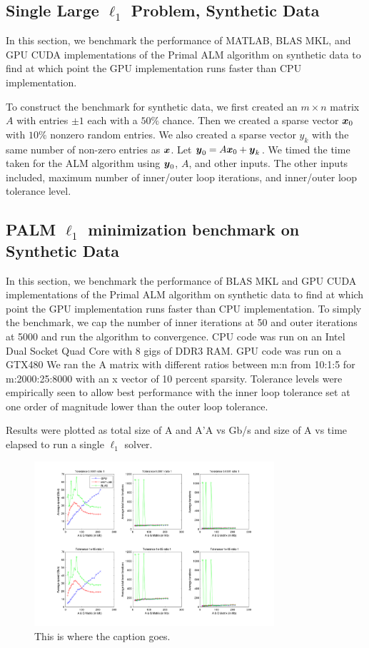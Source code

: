 \documentclass[10pt,twocolumn,letterpaper]{article}
\begin{document}
\subsection{Single Large $\ell_1$ Problem, Synthetic Data}
In this section, we benchmark the performance of MATLAB, BLAS MKL, and GPU CUDA
implementations of the Primal ALM algorithm on synthetic data to find at which
point the GPU implementation runs faster than CPU implementation.  

To construct the benchmark for synthetic data, we first created an $m \times n$
matrix $A$ with entries $\pm 1$ each with a $50\%$ chance.  Then we created a
sparse vector ${\boldsymbol{x}}_0$ with $10\%$ nonzero random entries.  We also created a
sparse vector $y_k$ with the same number of non-zero entries as ${\boldsymbol{x}}$.  Let
$\boldsymbol{y}_0 = A {\boldsymbol{x}}_0 + \boldsymbol{y}_k$.  We timed the time taken for the ALM algorithm using
$\boldsymbol{y}_0$, $A$, and other inputs.  The other inputs included, maximum number of
inner/outer loop iterations, and inner/outer loop tolerance level.


\subsection{PALM $\ell_1$ minimization benchmark on Synthetic Data}

In this section, we benchmark the performance of BLAS MKL and GPU CUDA
implementations of the Primal ALM algorithm on synthetic data to find at which
point the GPU implementation runs faster than CPU implementation.  To simply
the benchmark, we cap the number of inner iterations at 50 and outer iterations
at 5000 and run the algorithm to convergence.  CPU code was run on an Intel
Dual Socket Quad Core with 8 gigs of DDR3 RAM.  GPU code was run on a GTX480 We
ran the A matrix with different ratios between m:n from 10:1:5 for m:2000:25:8000 with an x vector of 10 percent sparsity.  Tolerance levels were
empirically seen to allow best performance with the inner loop tolerance set at
one order of magnitude lower than the outer loop tolerance.

Results were plotted as total size of A and A'A vs Gb/s and size of A vs time
elapsed to run a single $\ell_1$ solver.

\begin{figure}
\centering
\includegraphics[width=3.5in]{figures/PALM_benchmark_ratio_1.png}
\caption{This is where the caption goes.}
\label{fig:uniqueidentifierforthisimage}
\end{figure}
\end{document}
